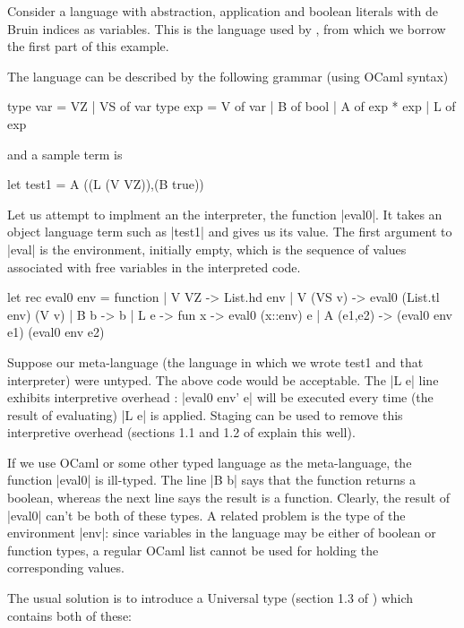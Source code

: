 \documentclass[preprint]{sigplanconf}
\let\cite=\citep
\begin{document}
Consider a language with abstraction, application and boolean
literals with de Bruin indices as variables. This is the language used
by \citet{WalidICFP02}, from which we borrow the first part of 
this example.

The language can be described by the following grammar (using OCaml
syntax)


\begin{code}
  type var = VZ | VS of var
  type exp = V of var | B of bool | A of exp * exp | L of exp
\end{code}

and a sample term is
\begin{code}
  let test1 = A ((L (V VZ)),(B true))
\end{code}

Let us attempt to implment an the interpreter, the function |eval0|. It takes
an object language term such as |test1| and gives us its value.
The first argument to |eval| is the environment, initially empty,
which is the sequence of values associated with free variables in the
interpreted code.
\begin{code}
  let rec eval0 env = function 
  | V VZ      -> List.hd env
  | V (VS v)  -> eval0 (List.tl env) (V v)
  | B b       -> b 
  | L e       -> fun x -> eval0 (x::env) e
  | A (e1,e2) -> (eval0 env e1) (eval0 env e2) 
\end{code}

Suppose our meta-language (the language in which we wrote test1
and that interpreter) were untyped. The above code would be acceptable.
The |L e| line exhibits interpretive overhead \cite{WalidICFP02}: 
|eval0 env' e| will be executed every time (the result of
evaluating) |L e| is applied. Staging can be used to remove this
interpretive overhead (sections 1.1 and 1.2 of \cite{WalidICFP02} explain
this well). 

If we use OCaml or some other typed language as the meta-language, 
the function |eval0| is ill-typed. The line |B b|
says that the function returns a boolean, whereas the next line says
the result is a function. Clearly, the result of |eval0|
can't be both of these types. 
A related problem is the type of the environment |env|: since variables
in the language may be either of boolean or function types, a regular
OCaml list cannot be used for holding the corresponding values. 

The usual solution is to introduce a Universal type (section 1.3 of
\cite{WalidICFP02}) which contains both of these:
\end{document}
